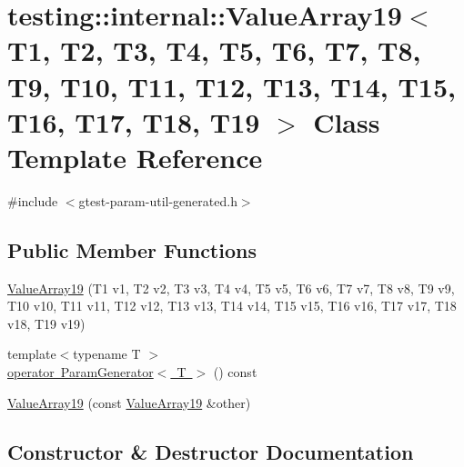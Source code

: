 \hypertarget{classtesting_1_1internal_1_1ValueArray19}{}\section{testing\+::internal\+::Value\+Array19$<$ T1, T2, T3, T4, T5, T6, T7, T8, T9, T10, T11, T12, T13, T14, T15, T16, T17, T18, T19 $>$ Class Template Reference}
\label{classtesting_1_1internal_1_1ValueArray19}


{\ttfamily \#include $<$gtest-\/param-\/util-\/generated.\+h$>$}

\subsection*{Public Member Functions}
\begin{DoxyCompactItemize}
\item 
\mbox{\hyperlink{classtesting_1_1internal_1_1ValueArray19_a1ffcdacd1ffb1d6718187a66458c09e2}{Value\+Array19}} (T1 v1, T2 v2, T3 v3, T4 v4, T5 v5, T6 v6, T7 v7, T8 v8, T9 v9, T10 v10, T11 v11, T12 v12, T13 v13, T14 v14, T15 v15, T16 v16, T17 v17, T18 v18, T19 v19)
\item 
{\footnotesize template$<$typename T $>$ }\\\mbox{\hyperlink{classtesting_1_1internal_1_1ValueArray19_a8ddd6c1de46e25310cf844895c7c8cf6}{operator Param\+Generator$<$ T $>$}} () const
\item 
\mbox{\hyperlink{classtesting_1_1internal_1_1ValueArray19_a1029ebc5d39633e2fb278e051d0ec1d0}{Value\+Array19}} (const \mbox{\hyperlink{classtesting_1_1internal_1_1ValueArray19}{Value\+Array19}} \&other)
\end{DoxyCompactItemize}


\subsection{Constructor \& Destructor Documentation}
\mbox{\label{classtesting_1_1internal_1_1ValueArray19_a1ffcdacd1ffb1d6718187a66458c09e2}} 
